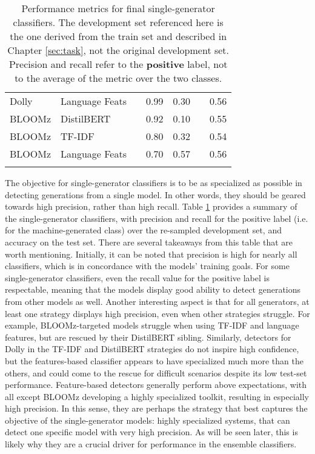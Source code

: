 \begin{table}[ht]
\begin{tabular}{llp{10px}ccp{10px}c}
        Dolly                  & Language Feats            &  & 0.99                                & 0.30          &          & 0.56            \\
        BLOOMz                 & DistilBERT                &  & 0.92                                & 0.10          &          & 0.55            \\
        BLOOMz                 & TF-IDF                    &  & 0.80                                & 0.32          &          & 0.54            \\
        BLOOMz                 & Language Feats            &  & 0.70                                & 0.57          &          & 0.56            \\
        \bottomrule
        \vspace{0.1cm}
    \end{tabular}
    \caption{
        Performance metrics for final single-generator classifiers.
        The development set referenced here is the one derived from the train set and described in Chapter \ref{sec:task}, not the original development set.
        Precision and recall refer to the \textbf{positive} label, not to the average of the metric over the two classes.
    }
    \label{tab:subsolutions-final}
\end{table}

The objective for single-generator classifiers is to be as specialized as possible in detecting generations from a single model.
In other words, they should be geared towards high precision, rather than high recall.
Table \ref{tab:subsolutions-final} provides a summary of the single-generator classifiers, with precision and recall for the positive label (i.e. for the machine-generated class) over the re-sampled development set, and accuracy on the test set.
There are several takeaways from this table that are worth mentioning.
Initially, it can be noted that precision is high for nearly all classifiers, which is in concordance with the models' training goals.
For some single-generator classifiers, even the recall value for the positive label is respectable, meaning that the models display good ability to detect generations from other models as well.
Another interesting aspect is that for all generators, at least one strategy displays high precision, even when other strategies struggle.
For example, BLOOMz-targeted models struggle when using TF-IDF and language features, but are rescued by their DistilBERT sibling.
Similarly, detectors for Dolly in the TF-IDF and DistilBERT strategies do not inspire high confidence, but the features-based classifier appears to have specialized much more than the others, and could come to the rescue for difficult scenarios despite its low test-set performance.
Feature-based detectors generally perform above expectations, with all except BLOOMz developing a highly specialized toolkit, resulting in especially high precision.
In this sense, they are perhaps the strategy that best captures the objective of the single-generator models: highly specialized systems, that can detect one specific model with very high precision.
As will be seen later, this is likely why they are a crucial driver for performance in the ensemble classifiers.

